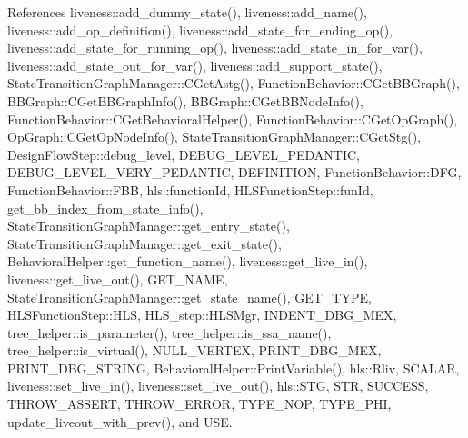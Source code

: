 References liveness\+::add\+\_\+dummy\+\_\+state(), liveness\+::add\+\_\+name(), liveness\+::add\+\_\+op\+\_\+definition(), liveness\+::add\+\_\+state\+\_\+for\+\_\+ending\+\_\+op(), liveness\+::add\+\_\+state\+\_\+for\+\_\+running\+\_\+op(), liveness\+::add\+\_\+state\+\_\+in\+\_\+for\+\_\+var(), liveness\+::add\+\_\+state\+\_\+out\+\_\+for\+\_\+var(), liveness\+::add\+\_\+support\+\_\+state(), State\+Transition\+Graph\+Manager\+::\+C\+Get\+Astg(), Function\+Behavior\+::\+C\+Get\+B\+B\+Graph(), B\+B\+Graph\+::\+C\+Get\+B\+B\+Graph\+Info(), B\+B\+Graph\+::\+C\+Get\+B\+B\+Node\+Info(), Function\+Behavior\+::\+C\+Get\+Behavioral\+Helper(), Function\+Behavior\+::\+C\+Get\+Op\+Graph(), Op\+Graph\+::\+C\+Get\+Op\+Node\+Info(), State\+Transition\+Graph\+Manager\+::\+C\+Get\+Stg(), Design\+Flow\+Step\+::debug\+\_\+level, D\+E\+B\+U\+G\+\_\+\+L\+E\+V\+E\+L\+\_\+\+P\+E\+D\+A\+N\+T\+IC, D\+E\+B\+U\+G\+\_\+\+L\+E\+V\+E\+L\+\_\+\+V\+E\+R\+Y\+\_\+\+P\+E\+D\+A\+N\+T\+IC, D\+E\+F\+I\+N\+I\+T\+I\+ON, Function\+Behavior\+::\+D\+FG, Function\+Behavior\+::\+F\+BB, hls\+::function\+Id, H\+L\+S\+Function\+Step\+::fun\+Id, get\+\_\+bb\+\_\+index\+\_\+from\+\_\+state\+\_\+info(), State\+Transition\+Graph\+Manager\+::get\+\_\+entry\+\_\+state(), State\+Transition\+Graph\+Manager\+::get\+\_\+exit\+\_\+state(), Behavioral\+Helper\+::get\+\_\+function\+\_\+name(), liveness\+::get\+\_\+live\+\_\+in(), liveness\+::get\+\_\+live\+\_\+out(), G\+E\+T\+\_\+\+N\+A\+ME, State\+Transition\+Graph\+Manager\+::get\+\_\+state\+\_\+name(), G\+E\+T\+\_\+\+T\+Y\+PE, H\+L\+S\+Function\+Step\+::\+H\+LS, H\+L\+S\+\_\+step\+::\+H\+L\+S\+Mgr, I\+N\+D\+E\+N\+T\+\_\+\+D\+B\+G\+\_\+\+M\+EX, tree\+\_\+helper\+::is\+\_\+parameter(), tree\+\_\+helper\+::is\+\_\+ssa\+\_\+name(), tree\+\_\+helper\+::is\+\_\+virtual(), N\+U\+L\+L\+\_\+\+V\+E\+R\+T\+EX, P\+R\+I\+N\+T\+\_\+\+D\+B\+G\+\_\+\+M\+EX, P\+R\+I\+N\+T\+\_\+\+D\+B\+G\+\_\+\+S\+T\+R\+I\+NG, Behavioral\+Helper\+::\+Print\+Variable(), hls\+::\+Rliv, S\+C\+A\+L\+AR, liveness\+::set\+\_\+live\+\_\+in(), liveness\+::set\+\_\+live\+\_\+out(), hls\+::\+S\+TG, S\+TR, S\+U\+C\+C\+E\+SS, T\+H\+R\+O\+W\+\_\+\+A\+S\+S\+E\+RT, T\+H\+R\+O\+W\+\_\+\+E\+R\+R\+OR, T\+Y\+P\+E\+\_\+\+N\+OP, T\+Y\+P\+E\+\_\+\+P\+HI, update\+\_\+liveout\+\_\+with\+\_\+prev(), and U\+SE.

